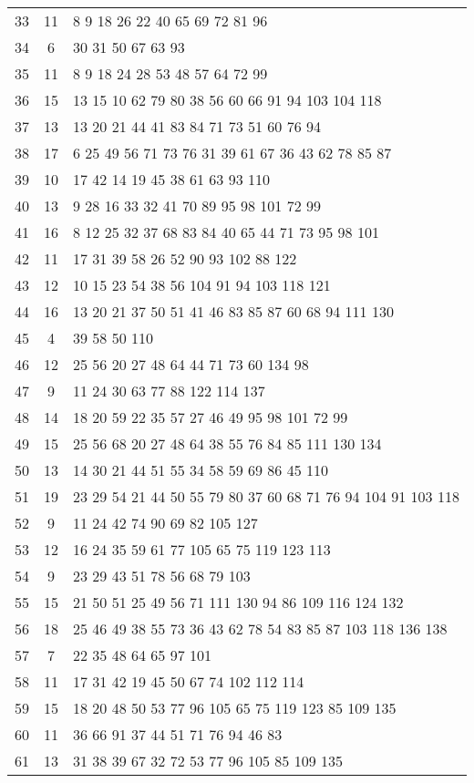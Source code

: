 \documentclass{standalone}
\begin{document}
\begin{tabular}{c c l}
33 & 11 & 8 9 18 26 22 40 65 69 72 81 96 \\
34 & 6 & 30 31 50 67 63 93 \\
35 & 11 & 8 9 18 24 28 53 48 57 64 72 99 \\
36 & 15 & 13 15 10 62 79 80 38 56 60 66 91 94 103 104 118 \\
37 & 13 & 13 20 21 44 41 83 84 71 73 51 60 76 94 \\
38 & 17 & 6 25 49 56 71 73 76 31 39 61 67 36 43 62 78 85 87 \\
39 & 10 & 17 42 14 19 45 38 61 63 93 110 \\
40 & 13 & 9 28 16 33 32 41 70 89 95 98 101 72 99 \\
41 & 16 & 8 12 25 32 37 68 83 84 40 65 44 71 73 95 98 101 \\
42 & 11 & 17 31 39 58 26 52 90 93 102 88 122 \\
43 & 12 & 10 15 23 54 38 56 104 91 94 103 118 121 \\
44 & 16 & 13 20 21 37 50 51 41 46 83 85 87 60 68 94 111 130 \\
45 & 4 & 39 58 50 110 \\
46 & 12 & 25 56 20 27 48 64 44 71 73 60 134 98 \\
47 & 9 & 11 24 30 63 77 88 122 114 137 \\
48 & 14 & 18 20 59 22 35 57 27 46 49 95 98 101 72 99 \\
49 & 15 & 25 56 68 20 27 48 64 38 55 76 84 85 111 130 134 \\
50 & 13 & 14 30 21 44 51 55 34 58 59 69 86 45 110 \\
51 & 19 & 23 29 54 21 44 50 55 79 80 37 60 68 71 76 94 104 91 103 118 \\
52 & 9 & 11 24 42 74 90 69 82 105 127 \\
53 & 12 & 16 24 35 59 61 77 105 65 75 119 123 113 \\
54 & 9 & 23 29 43 51 78 56 68 79 103 \\
55 & 15 & 21 50 51 25 49 56 71 111 130 94 86 109 116 124 132 \\
56 & 18 & 25 46 49 38 55 73 36 43 62 78 54 83 85 87 103 118 136 138 \\
57 & 7 & 22 35 48 64 65 97 101 \\
58 & 11 & 17 31 42 19 45 50 67 74 102 112 114 \\
59 & 15 & 18 20 48 50 53 77 96 105 65 75 119 123 85 109 135 \\
60 & 11 & 36 66 91 37 44 51 71 76 94 46 83 \\
61 & 13 & 31 38 39 67 32 72 53 77 96 105 85 109 135 \\

\end{tabular}
\end{document}
